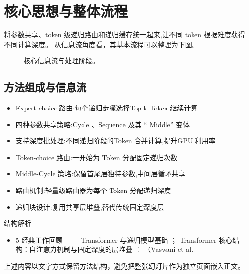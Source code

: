 \documentclass[UTF8,11pt,a4paper]{ctexart}
\begin{document}
\section{核心思想与整体流程}
将参数共享、token 级递归路由和递归缓存统一起来,让不同 token 根据难度获得不同计算深度。 从信息流角度看，其基本流程可以整理为下图。

\begin{figure}[H]
\centering
{}
\caption{核心信息流与处理阶段。}
\end{figure}

\subsection{方法组成与信息流}
\begin{itemize}
\item Expert-choice 路由:每个递归步骤选择Top-k Token 继续计算
\item 四种参数共享策略:Cycle 、Sequence 及其 “ Middle” 变体
\item 支持深度批处理:不同递归阶段的Token 合并计算,提升GPU 利用率
\item Token-choice 路由:一开始为 Token 分配固定递归次数
\item Middle-Cycle 策略:保留首尾层独特参数,中间层循环共享
\item 路由机制:轻量级路由器为每个 Token 分配递归深度
\item 递归块设计:复用共享层堆叠,替代传统固定深度层
\end{itemize}

\begin{keybox}{结构解析}
\begin{itemize}
\item 5 经典工作回顾 —— Transformer 与递归模型基础 ； Transformer 核心结构：自注意力机制与固定深度的层堆叠 ： （Vaswani et al.,
\end{itemize}
\end{keybox}

上述内容以文字方式保留方法结构，避免把整张幻灯片作为独立页面嵌入正文。
\end{document}
